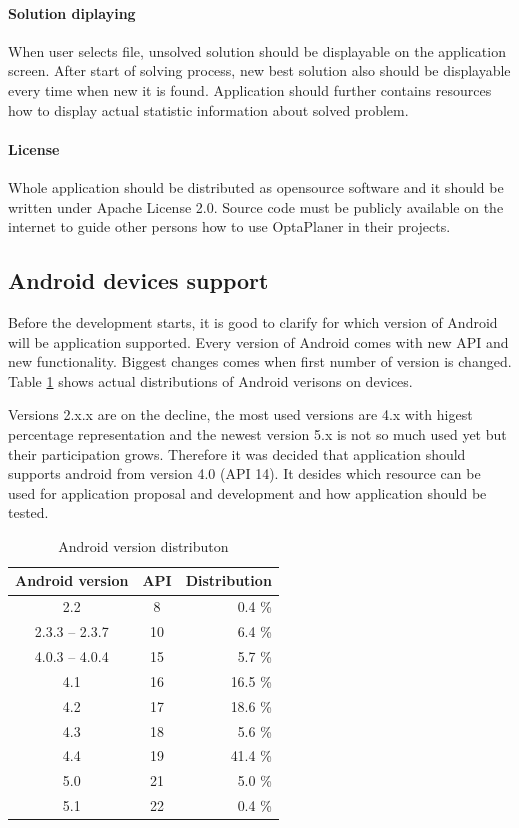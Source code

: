 \paragraph{Solution diplaying}
When user selects file, unsolved solution should be displayable on the application screen. After start of solving
process, new best solution also should be displayable every time when new it is found. Application should further
contains resources how to display actual statistic information about solved problem.

\paragraph{License}
Whole application should be distributed as opensource software and it should be written under Apache License 2.0.
Source code must be publicly available on the internet to guide other persons how to use OptaPlaner in their projects.

\subsection{Android devices support}
Before the development starts, it is good to clarify for which version of Android will be application supported. Every
version of Android comes with new API and new functionality. Biggest changes comes when first number of version is
changed. Table \ref{distributon} shows actual distributions of Android verisons on devices.

Versions 2.x.x are on the decline, the most used versions are 4.x with higest percentage representation and the newest
version 5.x is not so much used yet but their participation grows. Therefore it was decided that application should
supports android from version 4.0 (API 14). It desides which resource can be used for application proposal and
development and how application should be tested.

\begin {table}[h!]
    \begin{tabular}{|c|c|r|}
        \hline
        Android version   & API   & Distribution  \\ \hline \hline
        2.2               & 8     & 0.4 \%        \\ \hline
        2.3.3 -- 2.3.7    & 10    & 6.4 \%        \\ \hline
        4.0.3 -- 4.0.4    & 15    & 5.7 \%        \\ \hline
        4.1               & 16    & 16.5 \%       \\ \hline
        4.2               & 17    & 18.6 \%       \\ \hline
        4.3               & 18    & 5.6 \%        \\ \hline
        4.4               & 19    & 41.4 \%       \\ \hline
        5.0               & 21    & 5.0 \%        \\ \hline
        5.1               & 22    & 0.4 \%        \\ \hline
    \end{tabular}
    \centering
    \caption{Android version distributon \cite{Dashboards}}
    \label{distributon}
\end{table}

